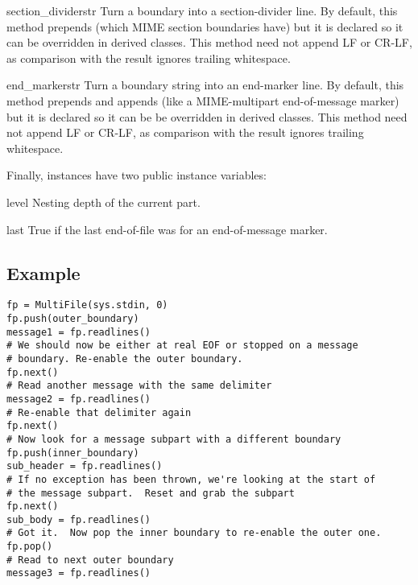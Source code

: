 \begin{methoddesc}{section_divider}{str}
Turn a boundary into a section-divider line.  By default, this
method prepends  (which MIME section boundaries have) but
it is declared so it can be overridden in derived classes.  This
method need not append LF or CR-LF, as comparison with the result
ignores trailing whitespace. 
\end{methoddesc}

\begin{methoddesc}{end_marker}{str}
Turn a boundary string into an end-marker line.  By default, this
method prepends  and appends  (like a
MIME-multipart end-of-message marker) but it is declared so it can be
be overridden in derived classes.  This method need not append LF or
CR-LF, as comparison with the result ignores trailing whitespace.
\end{methoddesc}

Finally,  instances have two public instance variables:

\begin{memberdesc}{level}
Nesting depth of the current part.
\end{memberdesc}

\begin{memberdesc}{last}
True if the last end-of-file was for an end-of-message marker. 
\end{memberdesc}


\subsection{ Example}
\label{multifile-example}


\begin{verbatim}
fp = MultiFile(sys.stdin, 0)
fp.push(outer_boundary)
message1 = fp.readlines()
# We should now be either at real EOF or stopped on a message
# boundary. Re-enable the outer boundary.
fp.next()
# Read another message with the same delimiter
message2 = fp.readlines()
# Re-enable that delimiter again
fp.next()
# Now look for a message subpart with a different boundary
fp.push(inner_boundary)
sub_header = fp.readlines()
# If no exception has been thrown, we're looking at the start of
# the message subpart.  Reset and grab the subpart
fp.next()
sub_body = fp.readlines()
# Got it.  Now pop the inner boundary to re-enable the outer one.
fp.pop()
# Read to next outer boundary
message3 = fp.readlines()
\end{verbatim}

